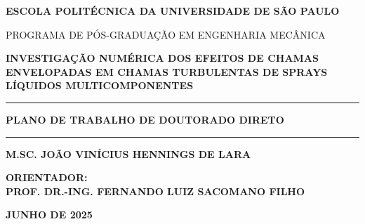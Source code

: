 \begin{titlepage}
    \centering
    {\bfseries
    ESCOLA POLITÉCNICA DA UNIVERSIDADE DE SÃO PAULO \par
    PROGRAMA DE PÓS-GRADUAÇÃO EM ENGENHARIA MECÂNICA
    \par}

    \vspace*{5cm}
    
    {\Large\bfseries{}
        INVESTIGAÇÃO NUMÉRICA DOS EFEITOS DE CHAMAS ENVELOPADAS EM CHAMAS TURBULENTAS DE SPRAYS LÍQUIDOS MULTICOMPONENTES 
    \par}
    
    \vspace{3cm}
    
    \hrule
    
    {\vspace{1cm}\large \bfseries
        PLANO DE TRABALHO DE DOUTORADO DIRETO
    \vspace{1cm}}
    
    \hrule
    
    \vspace{3cm}

    {\bfseries
         M.SC. JOÃO VINÍCIUS HENNINGS DE LARA
    \par}
    \vspace{1.5cm}

    {\bfseries
     ORIENTADOR:\\ PROF. DR.-ING. FERNANDO LUIZ SACOMANO FILHO
     \par}
    \vfill

    {\bfseries
        JUNHO DE 2025
    \par}
\end{titlepage}